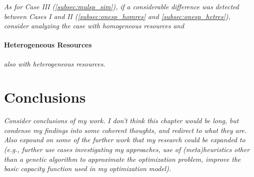 \documentclass[12pt,dvips]{report}
\begin{document}
\textit{As for Case III (\ref{subsec:mulsp_sim}), if a considerable difference was detected between Cases I and II (\ref{subsec:onesp_homres} and \ref{subsec:onesp_hetres}), consider analyzing the case with homogeneous resources and}

\subsubsection{Heterogeneous Resources} \label{subsubsec:mulsp_spec_hetres}

\textit{also with heterogeneous resources.}


\pagebreak
\chapter{Conclusions} \label{ch:conc}

\textit{Consider conclusions of my work.  I don't think this chapter would be long, but condense my findings into some coherent thoughts, and redirect to what they are.  Also expound on some of the further work that my research could be expanded to (e.g., further use cases investigating my approaches, use of (meta)heuristics other than a genetic algorithm to approximate the optimization problem, improve the basic capacity function used in my optimization model).}


%







\end{document}
